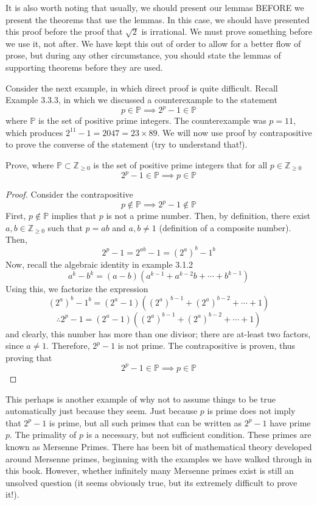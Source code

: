 It is also worth noting that usually, we should present our lemmas BEFORE we present the theorems that use the lemmas. In this case, we should have presented this proof before the proof that $\sqrt{2}$ is irrational. We must prove something before we use it, not after. We have kept this out of order to allow for a better flow of prose, but during any other circumstance, you should state the lemmas of supporting theorems before they are used. 

Consider the next example, in which direct proof is quite difficult. Recall Example 3.3.3, in which we discussed a counterexample to the statement 
\[
p \in \mathbb{P} \implies 2^p - 1 \in \mathbb{P}
\]
where $\mathbb{P}$ is the set of positive prime integers. The counterexample was $p = 11$, which produces $2^{11} - 1 = 2047 = 23 \times 89$. We will now use proof by contrapositive to prove the converse of the statement (try to understand that!).

\begin{example}
Prove, where $\mathbb{P} \subset \mathbb{Z}_{\geq 0}$ is the set of positive prime integers that for all $p \in \mathbb{Z}_{\geq 0}$
\[
2^p - 1 \in \mathbb{P} \implies p \in \mathbb{P}
\]
\end{example}
\begin{proof}
Consider the contrapositive
\[
p \notin \mathbb{P} \implies 2^p - 1 \notin \mathbb{P}
\]
First, $p \notin \mathbb{P}$ implies that $p$ is not a prime number. Then, by definition, there exist $a, b \in \mathbb{Z}_{\geq 0}$ such that $p = ab$ and $a, b \neq 1$ (definition of a composite number). Then,
\[
2^p - 1 = 2^{ab} - 1 = (2^{a})^b - 1^b
\]
Now, recall the algebraic identity in example 3.1.2
\[
a^k - b^k = (a-b)(a^{k-1} + a^{k-2}b + \cdots + b^{k-1})
\]
Using this, we factorize the expression
\[
(2^{a})^b - 1^b = (2^a - 1)((2^a)^{b-1} + (2^a)^{b-2} + \cdots + 1)
\]
\[
\therefore 2^p - 1 = (2^a - 1)((2^a)^{b-1} + (2^a)^{b-2} + \cdots + 1)
\]
and clearly, this number has more than one divisor; there are at-least two factors, since $a \neq 1$. Therefore, $2^p - 1$ is not prime. The contrapositive is proven, thus proving that 
\[
2^p - 1 \in \mathbb{P} \implies p \in \mathbb{P}
\]
\end{proof}

This perhaps is another example of why not to assume things to be true automatically just because they seem. Just because $p$ is prime does not imply that $2^p - 1$ is prime, but all such primes that can be written as $2^p - 1$ have prime $p$. The primality of $p$ is a necessary, but not sufficient condition. These primes are known as Mersenne Primes. There has been bit of mathematical theory developed around Mersenne primes, beginning with the examples we have walked through in this book. However, whether infinitely many Mersenne primes exist is still an unsolved question (it seems obviously true, but its extremely difficult to prove it!). 

